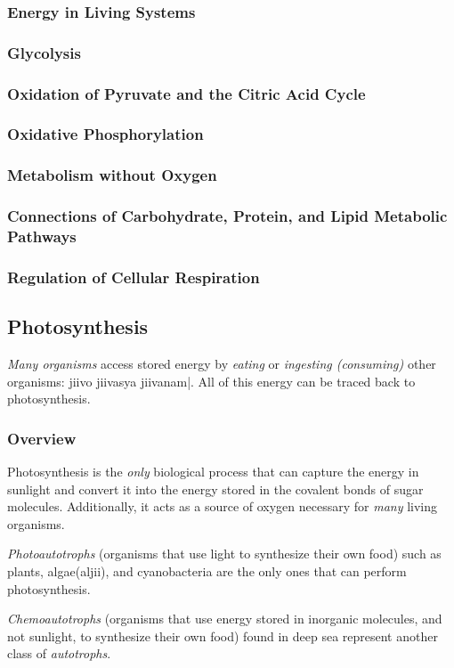 \subsubsection{Energy in Living Systems}
\subsubsection{Glycolysis}
\subsubsection{Oxidation of Pyruvate and the Citric Acid Cycle}
\subsubsection{Oxidative Phosphorylation}
\subsubsection{Metabolism without Oxygen}
\subsubsection{Connections of Carbohydrate, Protein, and Lipid Metabolic Pathways}
\subsubsection{Regulation of Cellular Respiration}
\subsection{Photosynthesis}
\emph{Many organisms} access stored energy by \emph{eating} or \emph{ingesting (consuming)} other organisms: \textmarathi{jiivo jiivasya jiivanam|}. All of this energy can be traced back to photosynthesis.
\subsubsection{Overview}
Photosynthesis is the \emph{only} biological process that can capture the energy in sunlight and convert it into the energy stored in the covalent bonds of sugar molecules. Additionally, it acts as a source of oxygen necessary for \emph{many} living organisms.

\emph{Photoautotrophs} (organisms that use light to synthesize their own food) such as plants, algae(\textmarathi{\dev aljii}), and cyanobacteria are the only ones that can perform photosynthesis.

\emph{Chemoautotrophs} (organisms that use energy stored in inorganic molecules, and not sunlight, to synthesize their own food) found in deep sea represent another class of \emph{autotrophs}.

